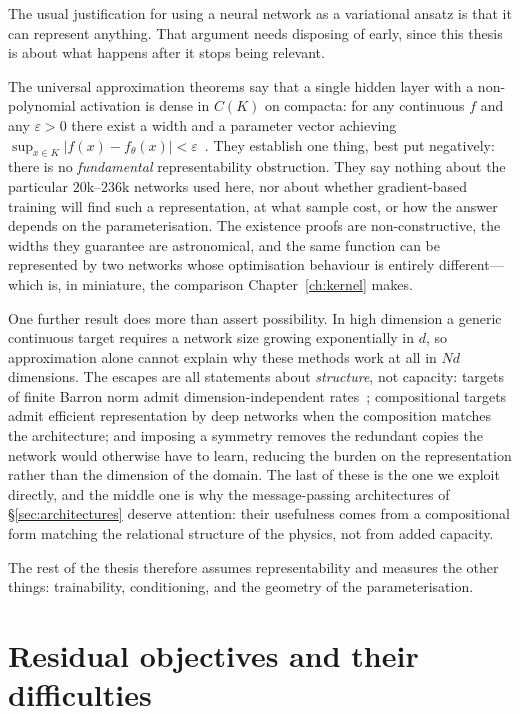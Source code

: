 The usual justification for using a neural network as a variational ansatz is that it can
represent anything. That argument needs disposing of early, since this thesis is about what
happens after it stops being relevant.

The universal approximation theorems say that a single hidden layer with a non-polynomial
activation is dense in $C(K)$ on compacta: for any continuous $f$ and any $\varepsilon>0$
there exist a width and a parameter vector achieving
$\sup_{x\in K}|f(x)-f_\theta(x)|<\varepsilon$~\cite{Cybenko1989,HORNIK1991251,LeshnoEtAl1993-NonpolyActivationUniversality}.
They establish one thing, best put negatively: there is no \emph{fundamental}
representability obstruction. They say nothing about the particular $20$k--$236$k networks
used here, nor about whether gradient-based training will find such a representation, at
what sample cost, or how the answer depends on the parameterisation. The existence proofs
are non-constructive, the widths they guarantee are astronomical, and the same function can
be represented by two networks whose optimisation behaviour is entirely different---which is,
in miniature, the comparison Chapter~\ref{ch:kernel} makes.

One further result does more than assert possibility. In high dimension a generic
continuous target requires a network size growing exponentially in $d$, so approximation
alone cannot explain why these methods work at all in $Nd$ dimensions.
The escapes are all statements about \emph{structure}, not capacity: targets of
finite Barron norm admit dimension-independent
rates~\cite{Barron1993-UniversalApprox}; compositional targets admit efficient
representation by deep networks when the composition matches the architecture; and imposing a symmetry removes the redundant
copies the network would otherwise have to learn, reducing the burden on the representation
rather than the dimension of the domain. The last of these is the one we exploit
directly, and the middle one is why the message-passing architectures of
\S\ref{sec:architectures} deserve attention: their usefulness comes from a compositional
form matching the relational structure of the physics, not from added capacity.

The rest of the thesis therefore assumes representability and measures the other things:
trainability, conditioning, and the geometry of the parameterisation.


\section{Residual objectives and their difficulties}
\label{sec:pinns}

